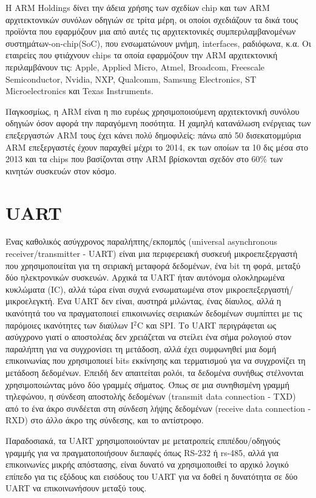 \documentclass[12pt, a4paper, oneside]{report}
\begin{document}
H ARM Holdings δίνει την άδεια χρήσης των σχεδίων chip και των ARM αρχιτεκτονικών συνόλων οδηγιών σε τρίτα μέρη, οι οποίοι σχεδιάζουν τα δικά τους προϊόντα που εφαρμόζουν μια από αυτές τις αρχιτεκτονικές συμπεριλαμβανομένων συστημάτων-on-chip(SoC), που ενσωματώνουν μνήμη, interfaces, ραδιόφωνα, κ.α. Οι εταιρείες που φτιάχνουν chips τα οποία εφαρμόζουν την ARM αρχιτεκτονική περιλαμβάνουν τις: Apple, Applied Micro, Atmel, Broadcom, Freescale Semiconductor, Nvidia, NXP, Qualcomm, Samsung Electronics, ST Microelectronics και Texas Instruments.

Παγκοσμίως, η ARM είναι η πιο ευρέως χρησιμοποιούμενη αρχιτεκτονική συνόλου οδηγιών όσον αφορά την παραγόμενη ποσότητα. Η χαμηλή κατανάλωση ενέργειας των επεξεργαστών ARM τους έχει κάνει πολύ δημοφιλείς: πάνω από 50 δισεκατομμύρια ARM επεξεργαστές έχουν παραχθεί μέχρι το 2014, εκ των οποίων τα 10 δις μέσα στο 2013 και τα chips που βασίζονται στην ARM βρίσκονται σχεδόν στο 60\%{} των κινητών συσκευών στον κόσμο.

\section{UART}

Ένας καθολικός ασύγχρονος παραλήπτης\slash εκπομπός (\textenglish{universal asynchronous receiver\slash transmitter - UART}) είναι μια περιφερειακή συσκευή μικροεπεξεργαστή που χρησιμοποιείται για τη σειριακή μεταφορά δεδομένων, ένα bit τη φορά, μεταξύ δύο ηλεκτρονικών συσκευών. Αρχικά τα UART ήταν αυτόνομα ολοκληρωμένα κυκλώματα (IC), αλλά τώρα είναι συχνά ενσωματωμένα στον μικροεπεξεργαστή\slash μικροελεγκτή. Ένα UART δεν είναι, αυστηρά μιλώντας, ένας δίαυλος, αλλά η ικανότητά του να πραγματοποιεί επικοινωνίες σειριακών δεδομένων συμπίπτει με τις παρόμοιες ικανότητες των διαύλων I$^2$C και SPI. Το UART περιγράφεται ως ασύγχρονο γιατί ο αποστολέας δεν χρειάζεται να στείλει ένα σήμα ρολογιού στον παραλήπτη για να συγχρονίσει τη μετάδοση, αλλά έχει συμφωνηθεί μια δομή επικοινωνίας που χρησιμοποιεί bits εκκίνησης και τερματισμού για να συγχρονίζει τη μετάδοση δεδομένων. Επειδή δεν απαιτείται ρολόι, τα δεδομένα συνήθως στέλνονται χρησιμοποιώντας μόνο δύο γραμμές σήματος. Όπως σε μια συνηθισμένη γραμμή τηλεφώνου, η σύνδεση αποστολής δεδομένων (\textenglish{transmit data connection - TXD}) από το ένα άκρο συνδέεται στη σύνδεση λήψης δεδομένων (\textenglish{receive data connection - RXD}) στο άλλο άκρο της σύνδεσης, και το αντίστροφο.

Παραδοσιακά, τα UART χρησιμοποιούνταν με μετατροπείς επιπέδου\slash οδηγούς γραμμής για να πραγματοποιήσουν διεπαφές όπως RS-232 ή rs-485, αλλά για επικοινωνίες μικρής απόστασης, είναι δυνατό να χρησιμοποιθεί το αρχικό λογικό επίπεδο για τις εξόδους και εισόδους του UART για να δοθεί η δυνατότητα σε δύο UART να επικοινωνήσουν μεταξύ τους.
\end{document}

